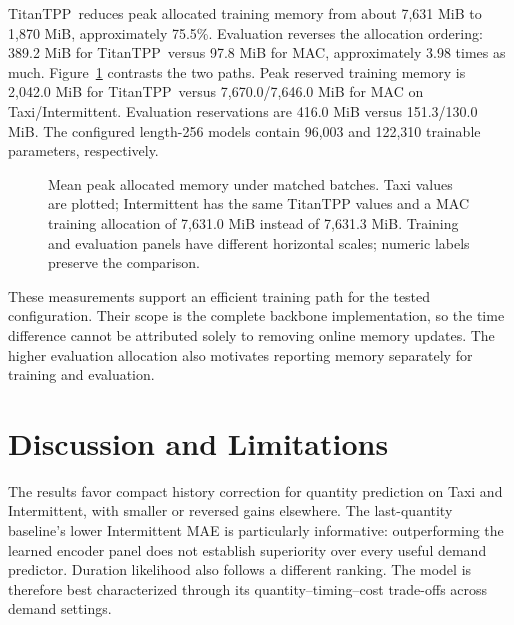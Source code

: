 \documentclass[runningheads]{llncs}
\providecommand{\Description}[1]{}
\newcommand{\method}{TitanTPP}
\begin{document}
\method\ reduces peak allocated training memory from about 7,631 MiB to
1,870 MiB, approximately 75.5\%. Evaluation reverses the allocation ordering:
389.2 MiB for \method\ versus 97.8 MiB for MAC, approximately 3.98 times
as much. Figure~\ref{fig:memory} contrasts the two paths.
Peak reserved training memory is 2,042.0 MiB for \method\ versus
7,670.0/7,646.0 MiB for MAC on Taxi/Intermittent. Evaluation reservations
are 416.0 MiB versus 151.3/130.0 MiB. The configured length-256 models
contain 96,003 and 122,310 trainable parameters, respectively.

\begin{figure}[t]
\centering
{}
\Description{Two paired horizontal bar panels compare allocated GPU memory.
Training uses about 7631 MiB for MAC and 1870 MiB for TitanTPP. Evaluation
uses 97.8 MiB for MAC and 389.2 MiB for TitanTPP. The evaluation panel has an
expanded scale and all bars carry numeric labels.}
\caption{Mean peak allocated memory under matched batches. Taxi values
are plotted; Intermittent has the same TitanTPP values and a MAC training
allocation of 7,631.0 MiB instead of 7,631.3 MiB. Training and evaluation
panels have different horizontal scales; numeric labels preserve the
comparison.}
\label{fig:memory}
\end{figure}

These measurements support an efficient training path for the tested
configuration. Their scope is the complete backbone implementation, so the
time difference cannot be attributed solely to removing online memory
updates. The higher evaluation allocation also motivates reporting memory
separately for training and evaluation.

\section{Discussion and Limitations}\label{sec:limitations}
The results favor compact history correction for quantity prediction on Taxi
and Intermittent, with smaller or reversed gains elsewhere. The last-quantity
baseline's lower Intermittent MAE is particularly informative: outperforming
the learned encoder panel does not establish superiority over every useful
demand predictor. Duration likelihood also follows a different ranking.
The model is therefore best characterized through its quantity--timing--cost
trade-offs across demand settings.
\end{document}
